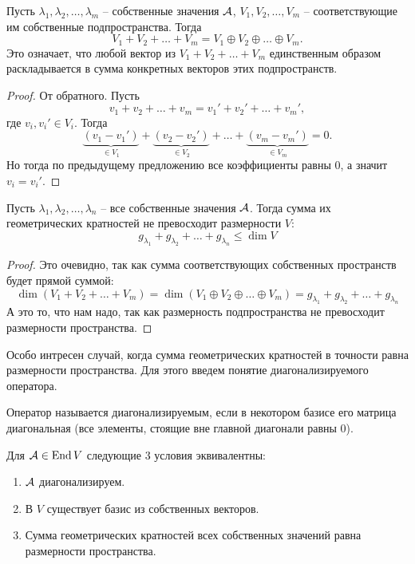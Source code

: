 \begin{follow}
    Пусть $\lambda_1, \lambda_2, \dots, \lambda_m$ -- собственные значения $\mathcal{A}$, $V_1, V_2, \dots, V_m$ -- соответствующие им собственные подпространства.
    Тогда \[ V_1 + V_2 + \dots + V_m = V_1 \oplus V_2 \oplus \dots \oplus V_m. \] 
    Это означает, что любой вектор из $V_1 + V_2 + \dots + V_m$ единственным образом раскладывается в сумма конкретных векторов этих подпространств.
\end{follow}

\begin{proof}
    От обратного. Пусть \[ v_1 + v_2 + \dots + v_m = v_1' + v_2' + \dots + v_m', \]
    \quad где $v_i, v_i' \in V_i$.
    Тогда \[ \underbrace{(v_1 - v_1')}_{\in V_1} + \underbrace{(v_2 - v_2')}_{\in V_2} + \dots + \underbrace{(v_m - v_m')}_{\in V_m} = 0. \]
    \quad Но тогда по предыдущему предложению все коэффициенты равны 0, а значит $v_i = v_i'$.
\end{proof}

\begin{follow}
    Пусть $\lambda_1, \lambda_2, \dots, \lambda_n$ -- все собственные значения $\mathcal{A}$. 
    Тогда сумма их геометрических кратностей не превосходит размерности $V$:
    \[ g_{\lambda_1} + g_{\lambda_2} + \dots + g_{\lambda_n} \leqslant \dim V \]
\end{follow}
\begin{proof}
    Это очевидно, так как сумма соответствующих собственных пространств будет прямой суммой:
    \[ \dim(V_1 + V_2 + \dots + V_m) 
    = \dim(V_1 \oplus V_2 \oplus \dots \oplus V_m)
    =  g_{\lambda_1} + g_{\lambda_2} + \dots + g_{\lambda_n} \]
    \quad А это то, что нам надо, так как размерность подпространства не превосходит размерности пространства.
\end{proof}
\vspace{5mm}

Особо интресен случай, когда сумма геометрических кратностей в точности равна размерности пространства.
Для этого введем понятие диагонализируемого оператора.
\begin{conj}
    Оператор называется диагонализируемым, если в некотором базисе его матрица диагональная 
    (все элементы, стоящие вне главной диагонали равны 0).
\end{conj}

\begin{theorem-non}
    Для $\mathcal{A} \in \operatorname{End} V$ следующие 3 условия эквивалентны:
    \begin{enumerate}
        \item $\mathcal{A}$ диагонализируем.
        \item В $V$ существует базис из собственных векторов.
        \item Сумма геометрических кратностей всех собственных значений равна размерности пространства.
    \end{enumerate} 
\end{theorem-non}

